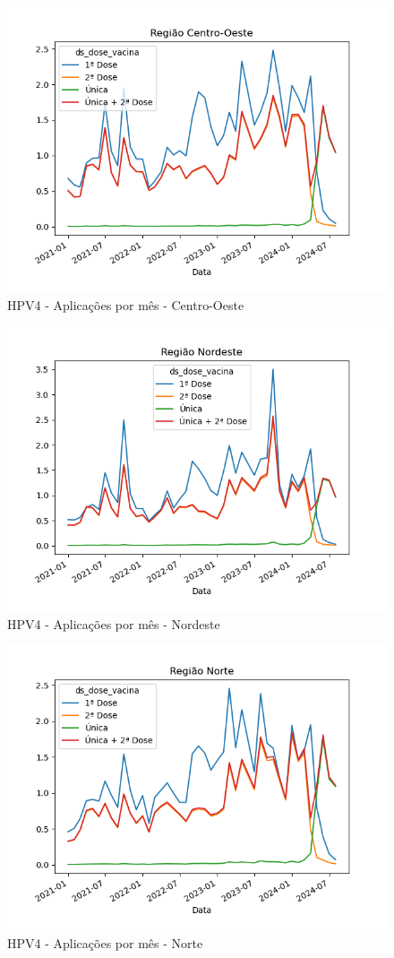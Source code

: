 \documentclass[12pt]{article}
\begin{document}
\begin{figure}[H]
    \centering
    \includegraphics[width=0.85\linewidth]{imagens/HPV4-Centro-Oeste-Aplicacoes-mes}
    \caption{HPV4 - Aplicações por mês - Centro-Oeste}
    \label{fig:HPV4-centro-oeste-aplicacoes}
\end{figure}
\begin{figure}[H]
    \centering
    \includegraphics[width=0.85\linewidth]{imagens/HPV4-Nordeste-Aplicacoes-mes}
    \caption{HPV4 - Aplicações por mês - Nordeste}
    \label{fig:HPV4-nordeste-aplicacoes-mes}
\end{figure}
\begin{figure}[H]
    \centering
    \includegraphics[width=0.85\linewidth]{imagens/HPV4-Norte-Aplicacoes-mes}
    \caption{HPV4 - Aplicações por mês - Norte}
    \label{fig:HPV4-norte-aplicacoes-mes}
\end{figure}
\end{document}
